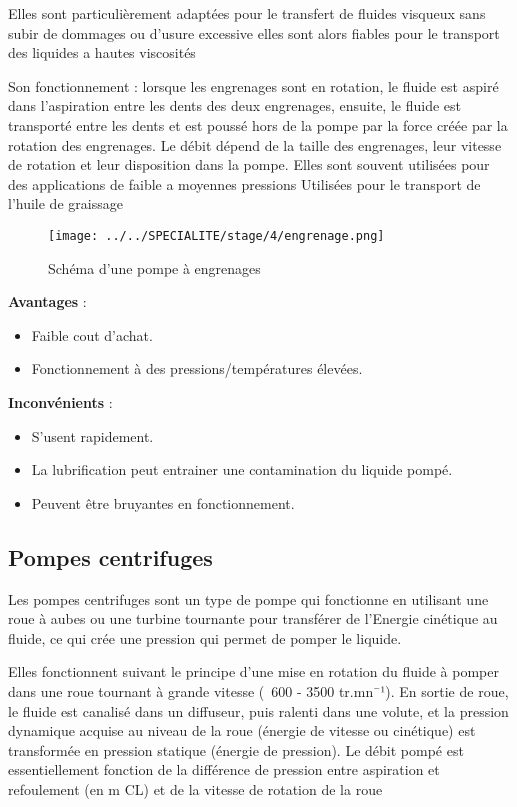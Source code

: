\documentclass[20pt,a4paper]{report}
\begin{document}
\begin{large}
Elles sont particulièrement adaptées pour le transfert de fluides visqueux sans subir de dommages ou d’usure excessive elles sont alors fiables pour le transport des liquides a hautes viscosités

Son fonctionnement : lorsque les engrenages sont en rotation, le fluide est aspiré dans l’aspiration entre les dents des deux engrenages, ensuite, le fluide est transporté entre les dents et est poussé hors de la pompe par la force créée par la rotation des engrenages. Le débit dépend de la taille des engrenages, leur vitesse de rotation et leur disposition dans la pompe. Elles sont souvent utilisées pour des applications de faible a moyennes pressions
Utilisées pour le transport de l’huile de graissage

					\begin{figure}[h]
					\caption{Schéma d'une pompe à engrenages}
					\centering
					\texttt{[image: ../../SPECIALITE/stage/4/engrenage.png]}
					\end{figure}
					
					
 
\textbf{Avantages} :

\begin{itemize}
	\item Faible cout d’achat.
	
	\item Fonctionnement à des pressions/températures élevées.
\end{itemize}
\textbf{Inconvénients} :

\begin{itemize}
	\item S’usent rapidement.
	
	\item La lubrification peut entrainer une contamination du liquide pompé.
	
	\item Peuvent être bruyantes en fonctionnement.
\end{itemize}

			\subsection{Pompes centrifuges}
Les pompes centrifuges sont un type de pompe qui fonctionne en utilisant une roue à aubes ou une turbine tournante pour transférer de l’Energie cinétique au fluide, ce qui crée une pression qui permet de pomper le liquide.

 Elles fonctionnent suivant le principe d'une mise en rotation du fluide à pomper dans une roue tournant à grande vitesse (~600 - 3500 tr.mn¯¹). En sortie de roue, le fluide est canalisé dans un diffuseur, puis ralenti dans une volute, et la pression dynamique acquise au niveau de la roue (énergie de vitesse ou cinétique) est transformée en pression statique (énergie de pression). Le débit pompé est essentiellement fonction de la différence de pression entre aspiration et refoulement (en m CL) et de la vitesse de rotation de la roue
 

\end{large}
\end{document}
